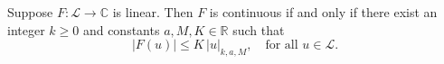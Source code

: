 Suppose $F: \mathcal{L} \rightarrow \mathbb{C}$ is linear. Then $F$ is continuous if and only if there exist an integer $k \geq 0$ and constants $a, M, K \in \mathbb{R}$ such that
$$|F(u)| \leq K \, |u|_{k,a,M}, \quad \text{for all } u \in \mathcal{L}.$$

